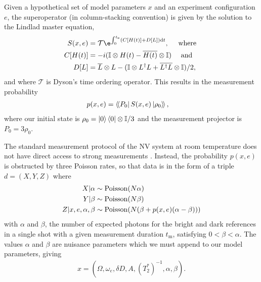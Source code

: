 \documentclass[aps,nofootinbib,twocolumn,superscriptaddress]{revtex4}
\newcommand{\mps}{x}
\newcommand{\eps}{e}
\newcommand{\data}{d}
\newcommand{\te}{t_\text{e}}
\newcommand{\tm}{t_\text{m}}
\renewcommand{\H}{H}    %
\renewcommand{\L}{L}    %
\renewcommand{\S}{S}    %
\begin{document}
Given a hypothetical set of model parameters $\mps$ and
an experiment configuration $\eps$, the superoperator
(in column-stacking convention) is given by the solution
to the Lindlad master equation,
\begin{subequations}
\begin{align}
    S(\mps,\eps)
        &=\mathcal{T}\e^{\int_0^{\te}(C[\H(t)]+D[\L])\dd t},
        \quad\text{ where } \\
    C[\H(t)]
        &=-i(\I\otimes\H(t)-\overline{\H(t)}\otimes\I)
        \quad\text{ and } \\
    D[L]
        &= \overline{L}\otimes L
            -(\I\otimes L^\dagger L + \overline{L^\dagger L}\otimes \I) / 2,
\end{align}
\end{subequations}
and where $\mathcal{T}$ is Dyson's time ordering operator.
This results in the measurement probability
\begin{align}
    p(\mps,\eps)
        &=  \dbra{P_0} \S(\mps,\eps)\dket{\rho_0},
    \label{eq:born-rule}
\end{align}
where our initial state is $\rho_0=\ket{0}\bra{0}\otimes\mathbb{I}/3$
and the measurement projector is $P_0=3\rho_0$.

The standard measurement protocol of the NV system at room
temperature does not have direct access to strong measurements
\cite{hincks_statistical_2018}.
Instead, the probability $p(\mps,\eps)$ is obstructed by three Poisson
rates, so that data is in the form of a triple $\data=(X,Y,Z)$
where
\begin{subequations}
\begin{align}
    X|\alpha
        & \sim\poissondist(N\alpha) \\
    Y|\beta
        & \sim\poissondist(N\beta) \\
    Z|\mps,\eps,\alpha,\beta
        & \sim\poissondist(N(\beta+p(\mps,\eps)(\alpha-\beta)))
\end{align}
\label{eq:nv-measurement}%
\end{subequations}
with $\alpha$ and $\beta$,
the number of expected
photons for the bright and dark references in a single shot with a
given measurement duration $\tm$,
 satisfying $0<\beta<\alpha$.
The values $\alpha$ and $\beta$ are nuisance parameters which we
must append to our model parameters, giving
\begin{align}
    \mps=(\Omega,\omega_e,\delta D,A,(T_2^*)^{-1},\alpha,\beta).
    \label{eq:nv-model-parameters}
\end{align}
\end{document}
